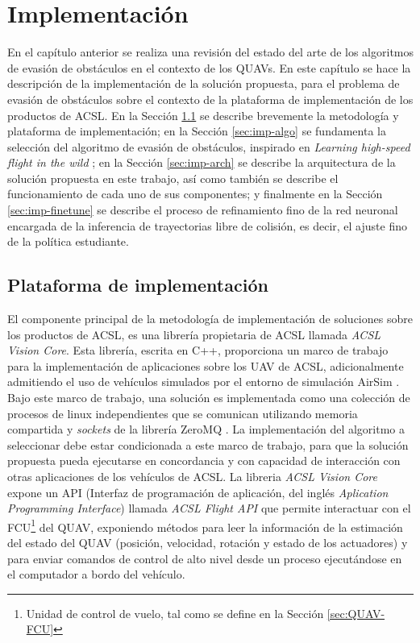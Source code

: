 \chapter{Implementación}
\label{capitulo5}

En el capítulo anterior se realiza una revisión del estado del arte de los algoritmos de evasión de obstáculos en el contexto de los QUAVs. En este capítulo se hace la descripción de la implementación de la solución propuesta, para el problema de evasión de obstáculos sobre el contexto de la plataforma de implementación de los productos de ACSL. En la Sección \ref{sec:imp-platform} se describe brevemente la metodología y plataforma de implementación; en la Sección \ref{sec:imp-algo} se fundamenta la selección del algoritmo de evasión de obstáculos, inspirado en \textit{Learning high-speed flight in the wild} \cite{Loquercio2021}; en la Sección \ref{sec:imp-arch} se describe la arquitectura de la solución propuesta en este trabajo, así como también se describe el funcionamiento de cada uno de sus componentes; y finalmente en la Sección \ref{sec:imp-finetune} se describe el proceso de refinamiento fino de la red neuronal encargada de la inferencia de trayectorias libre de colisión, es decir, el ajuste fino de la política estudiante.

\section{Plataforma de implementación}

\label{sec:imp-platform}

El componente principal de la metodología de implementación de soluciones sobre los productos de ACSL, es una librería propietaria de ACSL llamada \textit{ACSL Vision Core}. Esta librería, escrita en C++, proporciona un marco de trabajo para la implementación de aplicaciones sobre los UAV de ACSL, adicionalmente admitiendo el uso de vehículos simulados por el entorno de simulación AirSim \cite{shah2018airsim}. Bajo este marco de trabajo, una solución es implementada como una colección de procesos de linux independientes que se comunican utilizando memoria compartida y \textit{sockets} de la librería ZeroMQ \cite{zeroMQ}. La implementación del algoritmo a seleccionar debe estar condicionada a este marco de trabajo, para que la solución propuesta pueda ejecutarse en concordancia y con capacidad de interacción con otras aplicaciones de los vehículos de ACSL. La libreria \textit{ACSL Vision Core} expone un API (Interfaz de programación de aplicación, del inglés \textit{Aplication Programming Interface}) llamada \textit{ACSL Flight API} que permite interactuar con el FCU\footnote{Unidad de control de vuelo, tal como se define en la Sección \ref{sec:QUAV-FCU}} del QUAV, exponiendo métodos para leer la información de la estimación del estado del QUAV (posición, velocidad, rotación y estado de los actuadores) y para enviar comandos de control de alto nivel desde un proceso ejecutándose en el computador a bordo del vehículo.

